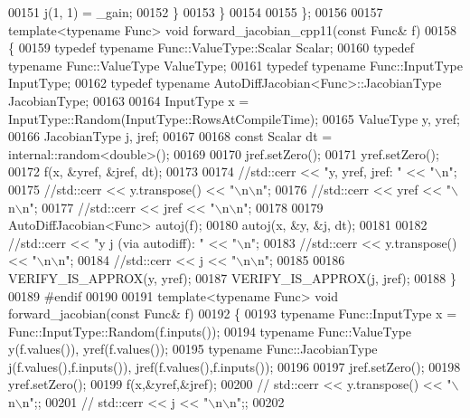 \begin{DoxyCode}
00151             j(1, 1) = \_gain;
00152         \}
00153     \}
00154 
00155 \};
00156 
00157 \textcolor{keyword}{template}<\textcolor{keyword}{typename} Func> \textcolor{keywordtype}{void} forward\_jacobian\_cpp11(\textcolor{keyword}{const} Func& f)
00158 \{
00159     \textcolor{keyword}{typedef} \textcolor{keyword}{typename} Func::ValueType::Scalar Scalar;
00160     \textcolor{keyword}{typedef} \textcolor{keyword}{typename} Func::ValueType ValueType;
00161     \textcolor{keyword}{typedef} \textcolor{keyword}{typename} Func::InputType InputType;
00162     \textcolor{keyword}{typedef} \textcolor{keyword}{typename} AutoDiffJacobian<Func>::JacobianType JacobianType;
00163 
00164     InputType x = InputType::Random(InputType::RowsAtCompileTime);
00165     ValueType y, yref;
00166     JacobianType j, jref;
00167 
00168     \textcolor{keyword}{const} Scalar dt = internal::random<double>();
00169 
00170     jref.setZero();
00171     yref.setZero();
00172     f(x, &yref, &jref, dt);
00173 
00174     \textcolor{comment}{//std::cerr << "y, yref, jref: " << "\(\backslash\)n";}
00175     \textcolor{comment}{//std::cerr << y.transpose() << "\(\backslash\)n\(\backslash\)n";}
00176     \textcolor{comment}{//std::cerr << yref << "\(\backslash\)n\(\backslash\)n";}
00177     \textcolor{comment}{//std::cerr << jref << "\(\backslash\)n\(\backslash\)n";}
00178 
00179     AutoDiffJacobian<Func> autoj(f);
00180     autoj(x, &y, &j, dt);
00181 
00182     \textcolor{comment}{//std::cerr << "y j (via autodiff): " << "\(\backslash\)n";}
00183     \textcolor{comment}{//std::cerr << y.transpose() << "\(\backslash\)n\(\backslash\)n";}
00184     \textcolor{comment}{//std::cerr << j << "\(\backslash\)n\(\backslash\)n";}
00185 
00186     VERIFY\_IS\_APPROX(y, yref);
00187     VERIFY\_IS\_APPROX(j, jref);
00188 \}
00189 \textcolor{preprocessor}{#endif}
00190 
00191 \textcolor{keyword}{template}<\textcolor{keyword}{typename} Func> \textcolor{keywordtype}{void} forward\_jacobian(\textcolor{keyword}{const} Func& f)
00192 \{
00193     \textcolor{keyword}{typename} Func::InputType x = Func::InputType::Random(f.inputs());
00194     \textcolor{keyword}{typename} Func::ValueType y(f.values()), yref(f.values());
00195     \textcolor{keyword}{typename} Func::JacobianType j(f.values(),f.inputs()), jref(f.values(),f.inputs());
00196 
00197     jref.setZero();
00198     yref.setZero();
00199     f(x,&yref,&jref);
00200 \textcolor{comment}{//     std::cerr << y.transpose() << "\(\backslash\)n\(\backslash\)n";;}
00201 \textcolor{comment}{//     std::cerr << j << "\(\backslash\)n\(\backslash\)n";;}
00202 

\end{DoxyCode}
